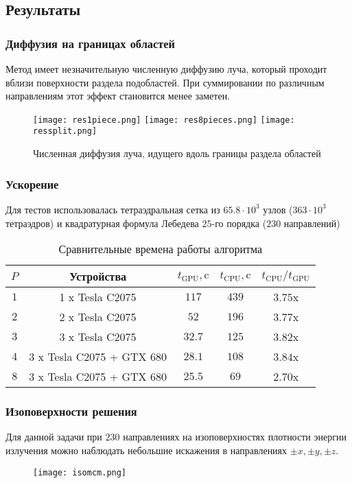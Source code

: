 \documentclass[unicode,aspectratio=43]{beamer}
\begin{document}
\subsection{Результаты}
\begin{frame}\frametitle{Диффузия на границах областей}
	Метод имеет незначительную численную диффузию луча, который проходит вблизи
поверхности раздела подобластей. При суммировании по различным направлениям этот
эффект становится менее заметен.
	\begin{figure}
	\centering
	\texttt{[image: res1piece.png]}
	\texttt{[image: res8pieces.png]}
	\texttt{[image: ressplit.png]}
	\caption{Численная диффузия луча, идущего вдоль границы раздела областей}
	\end{figure}
\end{frame}

\begin{frame}\frametitle{Ускорение}
	Для тестов использовалась тетраэдральная сетка из $65.8 \cdot 10^3$ узлов
($363\cdot10^3$ тетраэдров) и квадратурная формула Лебедева $25$-го порядка
($230$
направлений)
	\begin{table}
	\begin{tabular}{|c|c|c|c|c|}
	\hline
	$P$ & Устройства & $t_\text{GPU}, \text{c}$ & $t_\text{CPU}, \text{c}$ & $t_\text{CPU} / t_\text{GPU}$\\\hline
	$1$& 1 x Tesla C2075 & $117$ & $439$ & $3.75$x\\\hline
	$2$& 2 x Tesla C2075 & $52$ & $196$ & $3.77$x\\\hline
	$3$& 3 x Tesla C2075 & $32.7$ & $125$ & $3.82$x\\\hline
	$4$& 3 x Tesla C2075 + GTX 680 & $28.1$ & $108$ & $3.84$x\\
\hline
	$8$& 3 x Tesla C2075 + GTX 680 & $25.5$ & $69$ & $2.70$x\\\hline
	\end{tabular}
	\caption{Сравнительные времена работы алгоритма}
	\end{table}
\end{frame}

\begin{frame}\frametitle{Изоповерхности решения}
	Для данной задачи при $230$ направлениях на изоповерхностях плотности
энергии излучения можно наблюдать небольшие искажения в направлениях $\pm x, \pm y, \pm
z$.
	\begin{figure}
	\centering
	\texttt{[image: isomcm.png]}
	\end{figure}
\end{frame}
\end{document}
